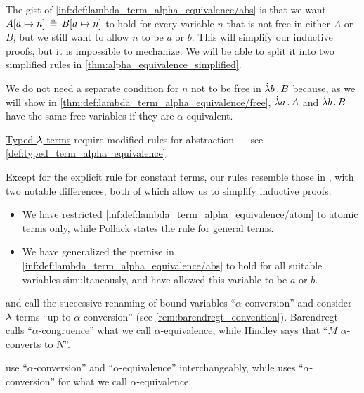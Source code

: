 \begin{definition}
  The gist of \ref{inf:def:lambda_term_alpha_equivalence/abs} is that we want \( A[a \mapsto n] \aequiv B[a \mapsto n] \) to hold for every variable \( n \) that is not free in either \( A \) or \( B \), but we still want to allow \( n \) to be \( a \) or \( b \). This will simplify our inductive proofs, but it is impossible to mechanize. We will be able to split it into two simplified rules in \cref{thm:alpha_equivalence_simplified}.

  We do not need a separate condition for \( n \) not to be free in \( \qabs b B \) because, as we will show in \cref{thm:def:lambda_term_alpha_equivalence/free}, \( \qabs a A \) and \( \qabs b B \) have the same free variables if they are \( \alpha \)-equivalent.
\end{definition}
\begin{comments}
  \item \hyperref[def:typed_lambda_term]{Typed \( {\mathrm \lambda} \)-terms} require modified rules for abstraction --- see \cref{def:typed_term_alpha_equivalence}.

  \item Except for the explicit rule for constant terms, our rules resemble those in \cite[5]{Pollack2005AlphaConversion}, with two notable differences, both of which allow us to simplify inductive proofs:
  \begin{itemize}
    \item We have restricted \ref{inf:def:lambda_term_alpha_equivalence/atom} to atomic terms only, while Pollack states the rule for general terms.
    \item We have generalized the premise in \ref{inf:def:lambda_term_alpha_equivalence/abs} to hold for all suitable variables simultaneously, and have allowed this variable to be \( a \) or \( b \).
  \end{itemize}

  \item {} and  call the successive renaming of bound variables \enquote{\( \alpha \)-conversion} and consider \( {\mathrm \lambda} \)-terms \enquote{up to \( \alpha \)-conversion} (see \cref{rem:barendregt_convention}). Barendregt calls \enquote{\( \alpha \)-congruence} what we call \( \alpha \)-equivalence, while Hindley says that \enquote{\( M \) \( \alpha \)-converts to \( N \)}.

   use \enquote{\( \alpha \)-conversion} and \enquote{\( \alpha \)-equivalence} interchangeably, while  uses \enquote{\( \alpha \)-conversion} for what we call \( \alpha \)-equivalence.


\end{comments}
